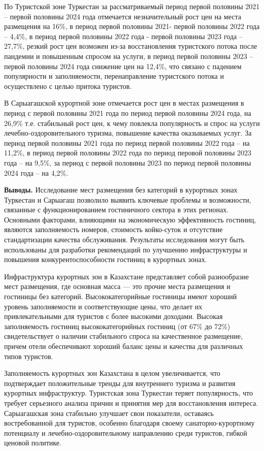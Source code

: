 По Туристской зоне Туркестан за рассматриваемый период первой половины
2021 -- первой половины 2024 года отмечается незначительный рост цен на
места размещения на 16\%, в период первой половины 2021- первой половины
2022 года -- 4,4\%, в период первой половины 2022 года - первой половины
2023 года -- 27,7\%, резкий рост цен возможен из-за восстановления
туристского потока после пандемии и повышенным спросом на услуги, в
период первой половины 2023 -- первой половины 2024 года снижение цен на
12,4\%, что связано с падением популярности и заполняемости,
перенаправление туристского потока и осуществлено с целью притока
туристов.

В Сарыагашской курортной зоне отмечается рост цен в местах размещения в
период с первой половины 2021 года по период первой половины 2024 года,
на 26,9\% т.е. стабильный рост цен, к чему повлекла популярность и спрос
на услуги лечебно-оздоровительного туризма, повышение качества
оказываемых услуг. За период первой половины 2021 года по период первой
половины 2022 года -- на 11,2\%, в период первой половины 2022 года по
период перовой половины 2023 года -- на 9,5\%, за период с первой
половины 2023 по период первой половины 2024 года -- на 4,2\%.

{\bfseries Выводы.} Исследование мест размещения без категорий в курортных
зонах Туркестан и Сарыагаш позволило выявить ключевые проблемы и
возможности, связанные с функционированием гостиничного сектора в этих
регионах. Основными факторами, влияющими на экономическую эффективность
гостиниц, являются заполняемость номеров, стоимость койко-суток и
отсутствие стандартизации качества обслуживания. Результаты исследования
могут быть использованы для разработки рекомендаций по улучшению
инфраструктуры и повышения конкурентоспособности гостиниц в курортных
зонах.

Инфраструктура курортных зон в Казахстане представляет собой
разнообразие мест размещения, где основная масса --- это прочие места
размещения и гостиницы без категорий. Высококатегорийные гостиницы имеют
хороший уровень заполняемости и соответствующие цены, что делает их
привлекательными для туристов с более высокими доходами. Высокая
заполняемость гостиниц высококатегорийных гостиниц (от 67\% до 72\%)
свидетельствует о наличии стабильного спроса на качественное размещение,
причем отели обеспечивают хороший баланс цены и качества для различных
типов туристов.

Заполняемость курортных зон Казахстана в целом увеличивается, что
подтверждает положительные тренды для внутреннего туризма и развития
курортных инфраструктур. Туристская зона Туркестан теряет популярность,
что требует серьезного анализа причин и принятия мер для восстановления
интереса. Сарыагашская зона стабильно улучшает свои показатели,
оставаясь востребованной для туристов, особенно благодаря своему
санаторно-курортному потенциалу и лечебно-оздоровительному направлению
среди туристов, гибкой ценовой политике.

